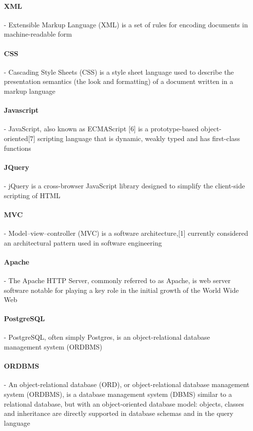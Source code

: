 \paragraph{XML} - Extensible Markup Language (XML) is a set of rules for encoding documents in machine-readable form
\paragraph{CSS} - Cascading Style Sheets (CSS) is a style sheet language used to describe the presentation semantics (the look and formatting) of a document written in a markup language
\paragraph{Javascript} - JavaScript, also known as ECMAScript [6] is a prototype-based object-oriented[7] scripting language that is dynamic, weakly typed and has first-class functions
\paragraph{JQuery} - jQuery is a cross-browser JavaScript library designed to simplify the client-side scripting of HTML
\paragraph{MVC} - Model–view–controller (MVC) is a software architecture,[1] currently considered an architectural pattern used in software engineering
\paragraph{Apache} - The Apache HTTP Server, commonly referred to as Apache, is web server software notable for playing a key role in the initial growth of the World Wide Web
\paragraph{PostgreSQL} - PostgreSQL, often simply Postgres, is an object-relational database management system (ORDBMS)
\paragraph{ORDBMS} - An object-relational database (ORD), or object-relational database management system (ORDBMS), is a database management system (DBMS) similar to a relational database, but with an object-oriented database model: objects, classes and inheritance are directly supported in database schemas and in the query language
